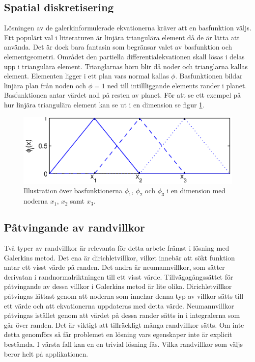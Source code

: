 \subsection{Spatial diskretisering}

Lösningen av de galerkinformulerade ekvationerna kräver att en basfunktion väljs.
Ett populärt val i litteraturen är linjära triangulära element då de
är lätta att använda. Det är dock bara fantasin som begränsar valet av basfunktion
och elementgeometri.
\cite{johnson2009}\cite{lewis04}\cite{reddy93}\cite{fem50} Området den
partiella differentialekvationen skall lösas i delas upp i triangulära element.
Trianglarnas hörn blir då noder och trianglarna kallas element. Elementen ligger i ett plan vars normal kallas $\phi$. Basfunktionen bildar linjära plan från noden och $\phi=1$ ned till intillliggande elements rander i planet. Basfunktionen antar värdet noll på resten av planet.\cite{johnson2009} För att se ett exempel på hur linjära
triangulära element kan se ut i en dimension se figur \ref{fig:basefunction}.

\begin{figure}
\centering
\includegraphics{images/basefunction.eps}
\caption{Illustration över basfunktionerna $\phi_1$, $\phi_2$ och $\phi_3$ i en
dimension med noderna $x_1$, $x_2$ samt $x_3$.}\label{fig:basefunction}
\end{figure}


\subsection{Påtvingande av randvillkor}
\label{subsec:boundaryenforcement}
Två typer av randvillkor är relevanta för detta arbete främst i lösning med Galerkins 
metod. Det ena är dirichletvillkor, vilket
innebär att sökt funktion antar ett visst värde på randen. Det andra är neumannvillkor,
som sätter derivatan i randnormalriktningen till ett visst värde. Tillvägagångssättet
för påtvingande av dessa villkor i Galerkins metod är lite olika. Dirichletvillkor
påtvingas lättast genom att noderna som innehar denna typ av villkor sätts till ett värde
och att ekvationerna uppdateras med detta värde. Neumannvillkor påtvingas istället
genom att värdet på dessa rander sätts in i integralerna som går över randen. Det
är viktigt att tillräckligt många randvillkor sätts. Om inte detta genomförs
så får problemet en lösning vars egenskaper inte är explicit bestämda. I värsta fall kan en en trivial lösning fås. Vilka randvillkor som väljs beror helt
på applikationen.



